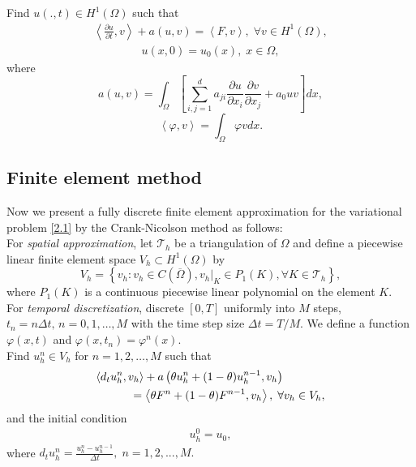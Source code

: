 \documentclass[twocolumn]{article}
\begin{document}
Find $u(.,t)\in H^1(\Omega)$ such that
\begin{align}\label{2.1}
	\left\langle \frac{\partial u}{\partial t}, v \right\rangle+a\left(u, v\right)=\left\langle F, v \right\rangle,\; \forall v\in H^1(\Omega),
\end{align} 
\begin{align}\label{2.2}
	u(x, 0)=u_0(x), \; x\in \Omega,
\end{align}
where 
$$a\left(u, v\right)=\int_{\Omega}\left[\sum_{i, j=1}^{d}a_{ji}\frac{\partial u}{\partial x_i}\frac{\partial v}{\partial x_j}+a_0uv\right]dx,$$
$$\left\langle \varphi, v \right\rangle=\int_{\Omega}\varphi vdx.$$
\subsection{Finite element method}
Now we present a fully discrete finite element approximation for the variational problem \eqref{2.1} by the Crank-Nicolson method as follows:
\\
For \textit{spatial approximation}, let $\mathcal{T}_h$ be a triangulation of $\Omega$ and define a piecewise linear finite element space $V_h \subset H^1(\Omega)$ by
$$V_h=\left\{v_h:v_h\in C(\overline{\Omega}), v_h|_K\in P_1(K), \forall K\in \mathcal{T}_h\right\},$$
where $P_1(K)$ is a continuous piecewise linear polynomial on the element $K$. 
\\
For \textit{temporal discretization}, discrete $[0, T]$ uniformly into $M$ steps, $t_n=n\Delta t,\, n=0, 1, \dots, M$ with the time step size $\Delta t = T/M$. We define a function $\varphi(x, t)$ and $\varphi(x, t_n)=\varphi^n(x)$.
\\
Find $u^n_h\in V_h$ for $n=1, 2, \dots, M$ such that
\begin{align}\label{2.3}
	&\langle d_tu^n_h, v_h \rangle+a\left(\theta u^n_h+(1-\theta)u^{n-1}_h, v_h\right)\notag\\
	&\qquad\quad=\left\langle \theta F^n+(1-\theta)F^{n-1}, v_h \right\rangle, \; \forall v_h\in V_h,
\end{align}
and the initial condition 
\begin{align}\label{2.4}
	u^0_h=u_0,
\end{align}
where $d_tu^n_h=\frac{u^n_h-u^{n-1}_h}{\Delta t}, \; n=1, 2, ..., M.$
\end{document}
